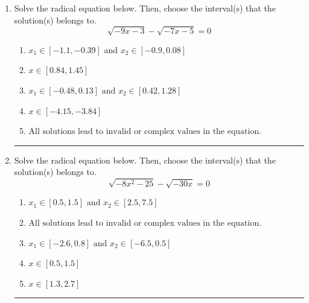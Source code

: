 \documentclass[14pt]{extbook}
\newcommand{\litem}[1]{\item#1\hspace*{-1cm}\rule{\textwidth}{0.4pt}}
\begin{document}
\begin{enumerate}
\litem{
Solve the radical equation below. Then, choose the interval(s) that the solution(s) belongs to.\[ \sqrt{-9 x - 3} - \sqrt{-7 x - 5} = 0 \]\begin{enumerate}[label=\Alph*.]
\item \( x_1 \in [-1.1, -0.39] \text{ and } x_2 \in [-0.9,0.08] \)
\item \( x \in [0.84,1.45] \)
\item \( x_1 \in [-0.48, 0.13] \text{ and } x_2 \in [0.42,1.28] \)
\item \( x \in [-4.15,-3.84] \)
\item \( \text{All solutions lead to invalid or complex values in the equation.} \)

\end{enumerate} }
\litem{
Solve the radical equation below. Then, choose the interval(s) that the solution(s) belongs to.\[ \sqrt{-8 x^2 - 25} - \sqrt{-30 x} = 0 \]\begin{enumerate}[label=\Alph*.]
\item \( x_1 \in [0.5, 1.5] \text{ and } x_2 \in [2.5,7.5] \)
\item \( \text{All solutions lead to invalid or complex values in the equation.} \)
\item \( x_1 \in [-2.6, 0.8] \text{ and } x_2 \in [-6.5,0.5] \)
\item \( x \in [0.5,1.5] \)
\item \( x \in [1.3,2.7] \)


\end{enumerate}}
\end{enumerate}
\end{document}

